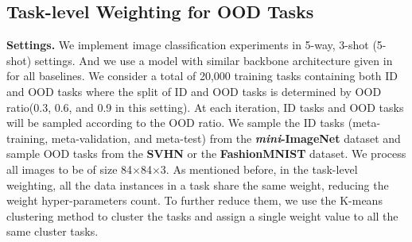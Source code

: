 \subsection{Task-level Weighting for OOD Tasks}
\label{sec:exp_task-level}
\vspace{-1mm}
\textbf{Settings.} We implement image classification experiments in 5-way, 3-shot (5-shot) settings. And we use a model with similar backbone architecture given in ~\citep{vinyals2016matching,finn2017model} for all baselines. We consider  a total of 20,000 training tasks containing both ID and OOD tasks where the split of ID and OOD tasks is determined by OOD ratio(0.3, 0.6, and 0.9 in this setting). At each iteration, ID tasks and OOD tasks will be sampled according to the OOD ratio. We sample the ID tasks (meta-training, meta-validation, and meta-test) from the \textbf{\textit{mini}-ImageNet} dataset and sample OOD tasks from the \textbf{SVHN} or the \textbf{FashionMNIST} dataset.  We process all images to be of size 84$\times$84$\times$3. As mentioned before, in the task-level weighting, all the data instances in a task share the same weight, reducing the weight hyper-parameters count. To further reduce them, we use the K-means clustering method to cluster the tasks and assign a single weight value to all the same cluster tasks. 


